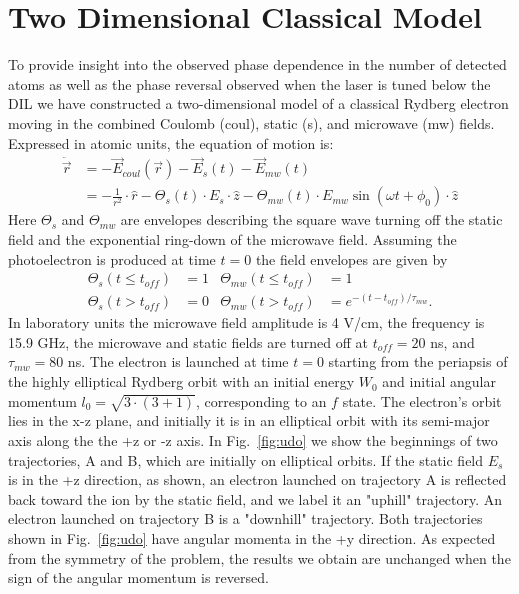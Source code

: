 \documentclass[aps,pra,preprint,groupedaddress]{revtex4-1}
\begin{document}
\section{\label{sec:disc} Two Dimensional Classical Model}

To provide insight into the observed phase dependence in the number of detected atoms as well as the phase reversal observed when the laser is tuned below the DIL we have constructed a two-dimensional model of a classical Rydberg electron moving in the combined Coulomb (coul), static (s), and microwave (mw) fields. Expressed in atomic units, the equation of motion is:
\begin{align*}
\ddot{\vec{r}} & = -\vec{E}_{coul}(\vec{r}) - \vec{E}_{s}(t) - \vec{E}_{mw}(t) \\
 & = -\frac{1}{r^2} \cdot \hat{r} - \Theta_s(t) \cdot E_{s} \cdot \hat{z} - \Theta_{mw}(t) \cdot E_{mw} \sin{(\omega t + \phi_0)} \cdot \hat{z}
\end{align*}
Here $\Theta_s$ and $\Theta_{mw}$ are envelopes describing the square wave turning off the static field and the exponential ring-down of the microwave field. Assuming the photoelectron is produced at time $t=0$ the field envelopes are given by
\begin{align*}
\Theta_s(t \leq t_{off}) & = 1 & \Theta_{mw}(t \leq t_{off}) & = 1 \\
\Theta_s(t > t_{off}) & = 0 & \Theta_{mw}(t > t_{off}) & = e^{-(t-t_{off})/\tau_{mw}}.
\end{align*}
In laboratory units the microwave field amplitude is 4 V/cm, the frequency is 15.9 GHz, the microwave and static fields are turned off at $t_{off} = 20$ ns, and $\tau_{mw} = 80$ ns. The electron is launched at time $t=0$ starting from the periapsis of the highly elliptical Rydberg orbit with an initial energy $W_0$ and initial angular momentum $l_0 = \sqrt{3 \cdot (3+1)}$, corresponding to an $f$ state. The electron's orbit lies in the x-z plane, and initially it is in an elliptical orbit with its semi-major axis along the the +z or -z axis. In Fig.~\ref{fig:udo} we show the beginnings of two trajectories, A and B, which are initially on elliptical orbits. If the static field $E_s$ is in the +z direction, as shown, an electron launched on trajectory A is reflected back toward the ion by the static field, and we label it an "uphill" trajectory. An electron launched on trajectory B is a "downhill" trajectory. Both trajectories shown in Fig.~\ref{fig:udo} have angular momenta in the +y direction. As expected from the symmetry of the problem, the results we obtain are unchanged when the sign of the angular momentum is reversed.
\end{document}
